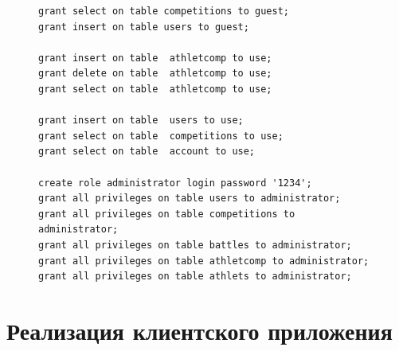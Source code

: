\begin{figure}[H]
	\begin{lstlisting}[label=lst:roles,caption=сценарии выделения ролей]
grant select on table competitions to guest;
grant insert on table users to guest;

grant insert on table  athletcomp to use;
grant delete on table  athletcomp to use;
grant select on table  athletcomp to use;

grant insert on table  users to use;
grant select on table  competitions to use;
grant select on table  account to use;

create role administrator login password '1234';
grant all privileges on table users to administrator;
grant all privileges on table competitions to administrator;
grant all privileges on table battles to administrator;
grant all privileges on table athletcomp to administrator;
grant all privileges on table athlets to administrator;
	\end{lstlisting}
\end{figure}

\section{Реализация клиентского приложения}

